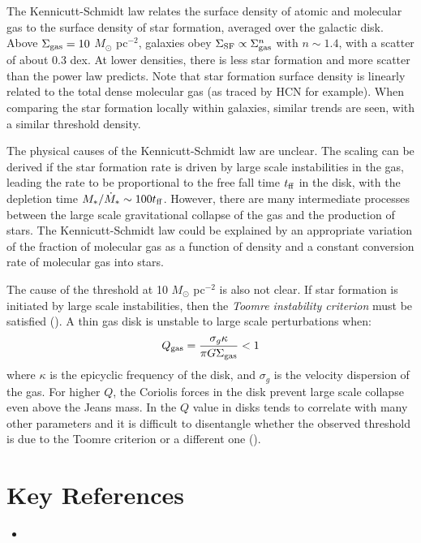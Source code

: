 The Kennicutt-Schmidt law relates the surface density of atomic and
molecular gas to the surface density of star formation, averaged over
the galactic disk. Above $\Sigma_{\rm gas} = 10$ $M_\odot$ pc$^{-2}$,
galaxies obey $\Sigma_{\rm SF} \propto \Sigma_{\rm gas}^n$ with $n\sim
1.4$, with a scatter of about 0.3 dex. At lower densities, there is
less star formation and more scatter than the power law predicts. Note
that star formation surface density is linearly related to the total
dense molecular gas (as traced by HCN for example). When comparing
the star formation locally within galaxies, similar trends are seen,
with a similar threshold density.

The physical causes of the Kennicutt-Schmidt law are unclear. The
scaling can be derived if the star formation rate is driven by large
scale instabilities in the gas, leading the rate to be proportional to
the free fall time $t_{\rm ff}$ in the disk, with the depletion time
$M_\ast/\dot M_\ast \sim 100 t_{\rm ff}$. However, there are many
intermediate processes between the large scale gravitational collapse
of the gas and the production of stars. The Kennicutt-Schmidt law
could be explained by an appropriate variation of the fraction of
molecular gas as a function of density and a constant conversion rate
of molecular gas into stars.

The cause of the threshold at 10 $M_\odot$ pc$^{-2}$ is also not
clear. If star formation is initiated by large scale instabilities,
then the {\it Toomre instability criterion} must be satisfied
(\citealt{toomre64a}). A thin gas disk is unstable to large scale
perturbations when:
\begin{equation}
Q_{\rm gas} = \frac{\sigma_g \kappa}{\pi G \Sigma_{\rm gas}} < 1
\end{equation}
where $\kappa$ is the epicyclic frequency of the disk, and $\sigma_g$
is the velocity dispersion of the gas. For higher $Q$, the Coriolis
forces in the disk prevent large scale collapse even above the Jeans
mass. In the $Q$ value in disks tends to correlate with many other
parameters and it is difficult to disentangle whether the observed
threshold is due to the Toomre criterion or a different one
(\citealt{leroy08a}).

\section{Key References}

\begin{itemize}
  \item \citet{kennicutt12a}
\end{itemize}

